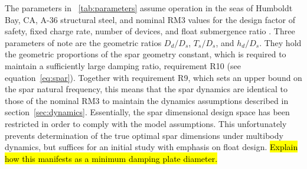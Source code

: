 The parameters in \tablename~\ref{tab:parameters} assume operation in the seas of Humboldt Bay, CA, A-36 structural steel, and nominal RM3 values for the design factor of safety, fixed charge rate, number of devices, and float submergence ratio \cite{RM3}. Three parameters of note are the geometric ratios $D_d/D_s$, $T_s/D_s$, and $h_d/D_s$. They hold the geometric proportions of the spar geometry constant, which is required to maintain a sufficiently large damping ratio, requirement R10 (see equation~\eqref{eq:spar}). Together with requirement R9, which sets an upper bound on the spar natural frequency, this means that the spar dynamics are identical to those of the nominal RM3 to maintain the dynamics assumptions described in section~\ref{sec:dynamics}. Essentially, the spar dimensional design space has been restricted in order to comply with the model assumptions. This unfortunately prevents determination of the true optimal spar dimensions under multibody dynamics, but suffices for an initial study with emphasis on float design. \hl{Explain how this manifests as a minimum damping plate diameter.}

